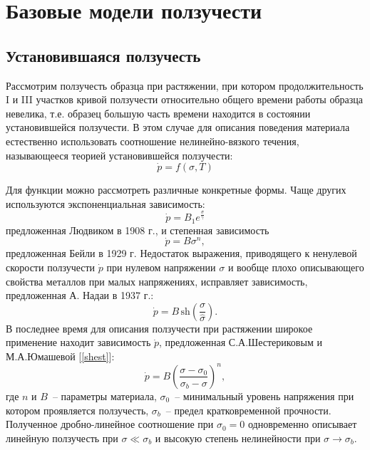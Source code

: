 \section{Базовые модели ползучести}

\subsection{Установившаяся ползучесть}
Рассмотрим ползучесть образца при растяжении, при котором продолжительность I и III участков кривой ползучести относительно общего времени работы образца невелика, т.е. образец большую часть времени находится в состоянии установившейся ползучести. 
В этом случае для описания поведения материала естественно использовать соотношение нелинейно-вязкого течения, называющееся теорией установившейся ползучести:
 \begin{equation}
 	\dot{p} = f(\sigma, T)
 \end{equation}
 
Для функции  можно рассмотреть различные конкретные формы. Чаще других используются экспоненциальная зависимость:
\begin{equation} 
	\dot{p} = B_1e^{\frac{\sigma}{\gamma}}
\end{equation}
предложенная Людвиком в 1908 г., и степенная зависимость
\begin{equation} 
	\dot{p} = B\sigma^n,
\end{equation}
предложенная Бейли в 1929 г. Недостаток выражения, приводящего к ненулевой скорости ползучести $\dot{p}$ при нулевом напряжении $\sigma$ и вообще плохо описывающего свойства металлов при малых напряжениях, исправляет зависимость, предложенная А. Надаи в 1937 г.:
\begin{equation}
	\dot{p} = B\, \text{sh}(\dfrac{\sigma}{\widehat{\sigma}}).
\end{equation}
В последнее время для описания ползучести при растяжении широкое применение находит зависимость $\dot{p}$, предложенная С.А.Шестериковым и М.А.Юмашевой [\ref{shest}]:
\begin{equation}
	\dot{p} = B\left(\dfrac{\sigma-\sigma_0}{\sigma_b-\sigma}\right)^n,
\end{equation}
где $n$ и $B$~-- параметры материала, $\sigma_0$~-- минимальный уровень напряжения при котором проявляется ползучесть, $\sigma_b$~-- предел кратковременной прочности.
Полученное дробно-линейное соотношение при $\sigma_0 = 0$ одновременно описывает линейную ползучесть при $\sigma \ll \sigma_b$ и высокую степень нелинейности при $\sigma \to \sigma_b$.
